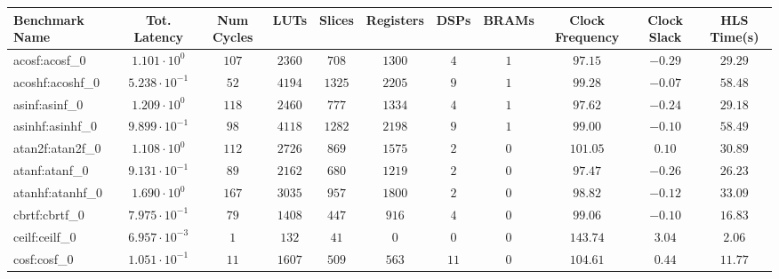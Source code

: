 \begin{tabular}{|l|c|c|c|c|c|c|c|c|c|c|}
\hline
Benchmark Name               & Tot. Latency            & Num Cycles & LUTs      & Slices    & Registers & DSPs    & BRAMs & Clock Frequency & Clock Slack & HLS Time(s) \\
\hline
acosf:acosf\_0               & $ 1.101 \cdot 10^{0}  $ & $ 107    $ & $ 2360  $ & $ 708   $ & $ 1300  $ & $ 4   $ & $ 1 $ & $ 97.15       $ & $ -0.29   $ & $ 29.29   $ \\
acoshf:acoshf\_0             & $ 5.238 \cdot 10^{-1} $ & $ 52     $ & $ 4194  $ & $ 1325  $ & $ 2205  $ & $ 9   $ & $ 1 $ & $ 99.28       $ & $ -0.07   $ & $ 58.48   $ \\
asinf:asinf\_0               & $ 1.209 \cdot 10^{0}  $ & $ 118    $ & $ 2460  $ & $ 777   $ & $ 1334  $ & $ 4   $ & $ 1 $ & $ 97.62       $ & $ -0.24   $ & $ 29.18   $ \\
asinhf:asinhf\_0             & $ 9.899 \cdot 10^{-1} $ & $ 98     $ & $ 4118  $ & $ 1282  $ & $ 2198  $ & $ 9   $ & $ 1 $ & $ 99.00       $ & $ -0.10   $ & $ 58.49   $ \\
atan2f:atan2f\_0             & $ 1.108 \cdot 10^{0}  $ & $ 112    $ & $ 2726  $ & $ 869   $ & $ 1575  $ & $ 2   $ & $ 0 $ & $ 101.05      $ & $ 0.10    $ & $ 30.89   $ \\
atanf:atanf\_0               & $ 9.131 \cdot 10^{-1} $ & $ 89     $ & $ 2162  $ & $ 680   $ & $ 1219  $ & $ 2   $ & $ 0 $ & $ 97.47       $ & $ -0.26   $ & $ 26.23   $ \\
atanhf:atanhf\_0             & $ 1.690 \cdot 10^{0}  $ & $ 167    $ & $ 3035  $ & $ 957   $ & $ 1800  $ & $ 2   $ & $ 0 $ & $ 98.82       $ & $ -0.12   $ & $ 33.09   $ \\
cbrtf:cbrtf\_0               & $ 7.975 \cdot 10^{-1} $ & $ 79     $ & $ 1408  $ & $ 447   $ & $ 916   $ & $ 4   $ & $ 0 $ & $ 99.06       $ & $ -0.10   $ & $ 16.83   $ \\
ceilf:ceilf\_0               & $ 6.957 \cdot 10^{-3} $ & $ 1      $ & $ 132   $ & $ 41    $ & $ 0     $ & $ 0   $ & $ 0 $ & $ 143.74      $ & $ 3.04    $ & $ 2.06    $ \\
cosf:cosf\_0                 & $ 1.051 \cdot 10^{-1} $ & $ 11     $ & $ 1607  $ & $ 509   $ & $ 563   $ & $ 11  $ & $ 0 $ & $ 104.61      $ & $ 0.44    $ & $ 11.77   $ \\

\end{tabular}

